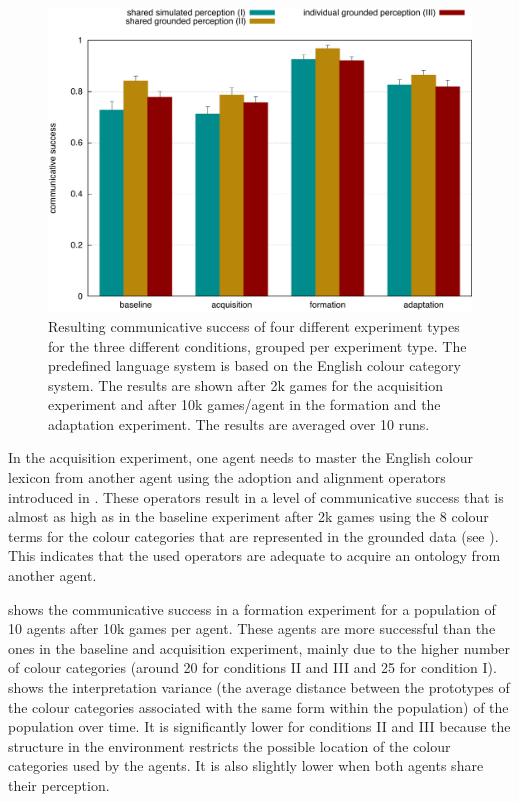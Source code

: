 \begin{figure}[htbp]
\begin{center}
\includegraphics[width=.8\textwidth]{./experiments/figures/grounding-comparison-communicative-success.pdf}
\caption[Communicative success in three different conditions for four
types of experiments]{Resulting communicative success of four
  different experiment types for the three different conditions,
  grouped per experiment type. The predefined language system is based
  on the English colour category system. The results are shown after
  2k games for the acquisition experiment and after 10k games/agent in
  the formation and the adaptation experiment. The results are
  averaged over 10 runs.}
\label{f:comparison-communicative-success}
\end{center}
\end{figure}

In the acquisition experiment, one agent needs to master the English
colour lexicon from another agent using the adoption and alignment
operators introduced in . These operators result in a
level of communicative success that is almost as high as in the
baseline experiment after 2k games using the 8 colour terms for the
colour categories that are represented in the grounded data (see
). This indicates that the used operators
are adequate to acquire an ontology from another agent.

 shows the
communicative success in a formation experiment for a population of 10
agents after 10k games per agent. These agents are more successful
than the ones in the baseline and acquisition experiment, mainly due
to the higher number of colour categories (around 20 for conditions II
and III and 25 for condition I).  shows the interpretation
variance (the average distance between the prototypes of the colour
categories associated with the same form within the population) of the
population over time. It is significantly lower for conditions II and
III because the structure in the environment restricts the possible
location of the colour categories used by the agents. It is also
slightly lower when both agents share their perception.

